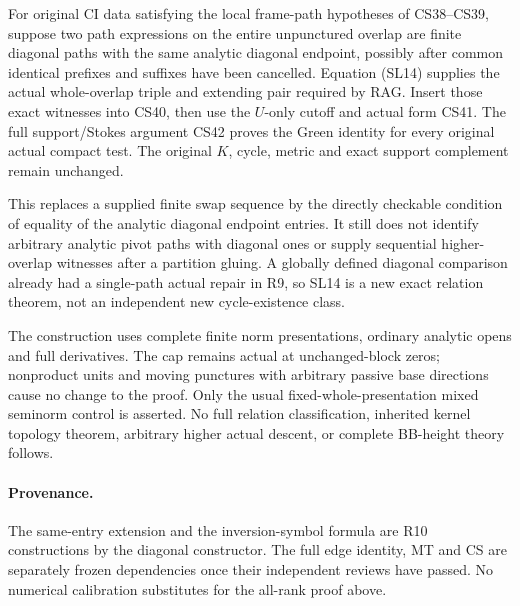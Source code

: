 For original CI data satisfying the local frame-path hypotheses
of CS38--CS39, suppose two path expressions on the entire
unpunctured overlap are finite diagonal paths with the same
analytic diagonal endpoint, possibly after common identical
prefixes and suffixes have been cancelled.  Equation (SL14)
supplies the actual whole-overlap triple and extending pair
required by RAG.  Insert those exact witnesses into CS40,
then use the $U$-only cutoff and actual form CS41.  The full
support/Stokes argument CS42 proves the Green identity for
every original actual compact test.  The original $K$, cycle,
metric and exact support complement remain unchanged.

This replaces a supplied finite swap sequence by the directly
checkable condition of equality of the analytic diagonal
endpoint entries.  It still does not identify arbitrary
analytic pivot paths with diagonal ones or supply sequential
higher-overlap witnesses after a partition gluing.  A globally
defined diagonal comparison already had a single-path actual
repair in R9, so SL14 is a new exact relation theorem, not an
independent new cycle-existence class.

The construction uses complete finite norm presentations,
ordinary analytic opens and full derivatives.  The cap remains
actual at unchanged-block zeros; nonproduct units and moving
punctures with arbitrary passive base directions cause no
change to the proof.  Only the usual fixed-whole-presentation
mixed seminorm control is asserted.  No full relation
classification, inherited kernel topology theorem, arbitrary
higher actual descent, or complete BB-height theory follows.

\paragraph{Provenance.}
The same-entry extension and the inversion-symbol formula are
R10 constructions by the diagonal constructor.  The full edge
identity, MT and CS are separately frozen dependencies once
their independent reviews have passed.  No numerical
calibration substitutes for the all-rank proof above.

